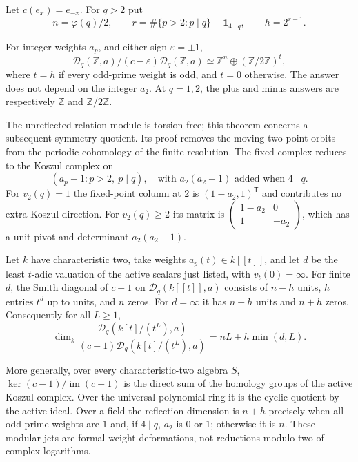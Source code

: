 Let $c(e_x)=e_{-x}$. For $q>2$ put
\[
 n=\varphi(q)/2,\qquad
 r=\#\{p>2:p\mid q\}+\mathbf1_{4\mid q},\qquad h=2^{r-1}.
\]
\begin{theorem}
\label{ir:insert:integer-reflection}
For integer weights $a_p$, and either sign $\varepsilon=\pm1$,
\[
 \mathcal D_q(\mathbb Z,a)/(c-\varepsilon)\mathcal D_q(\mathbb Z,a)
 \simeq\mathbb Z^n\oplus(\mathbb Z/2\mathbb Z)^t,
\]
where $t=h$ if every odd-prime weight is odd, and $t=0$ otherwise.
The answer does not depend on the integer $a_2$.
At $q=1,2$, the plus and minus answers are respectively
$\mathbb Z$ and $\mathbb Z/2\mathbb Z$.
\end{theorem}
The unreflected relation module is torsion-free; this theorem concerns
a subsequent symmetry quotient. Its proof removes the moving two-point
orbits from the periodic cohomology of the finite resolution. The fixed
complex reduces to the Koszul complex on
\[
 (a_p-1:p>2,\ p\mid q),
 \quad\text{with }a_2(a_2-1)\text{ added when }4\mid q.
\]
For $v_2(q)=1$ the fixed-point column at $2$ is
$(1-a_2,1)^{\mathsf T}$ and contributes no extra Koszul direction.
For $v_2(q)\ge2$ its matrix is
$\left(\begin{smallmatrix}1-a_2&0\\1&-a_2\end{smallmatrix}\right)$,
which has a unit pivot and determinant $a_2(a_2-1)$.

\begin{theorem}
\label{ir:insert:jets}
Let $k$ have characteristic two, take weights $a_p(t)\in k[[t]]$,
and let $d$ be the least $t$-adic valuation of the active scalars just
listed, with $v_t(0)=\infty$. For finite $d$, the Smith diagonal of
$c-1$ on $\mathcal D_q(k[[t]],a)$ consists of $n-h$ units,
$h$ entries $t^d$ up to units, and $n$ zeros. For $d=\infty$ it has
$n-h$ units and $n+h$ zeros. Consequently for all $L\ge1$,
\[
 \dim_k\frac{\mathcal D_q(k[t]/(t^L),a)}
 {(c-1)\mathcal D_q(k[t]/(t^L),a)}
 =nL+h\min(d,L).
\]
\end{theorem}
More generally, over every characteristic-two algebra $S$,
$\ker(c-1)/\operatorname{im}(c-1)$ is the direct sum of the homology
groups of the active Koszul complex. Over the universal polynomial
ring it is the cyclic quotient by the active ideal. Over a field the
reflection dimension is $n+h$ precisely when all odd-prime weights
are $1$ and, if $4\mid q$, $a_2$ is $0$ or $1$; otherwise it is $n$.
These modular jets are formal weight deformations, not reductions
modulo two of complex logarithms.


